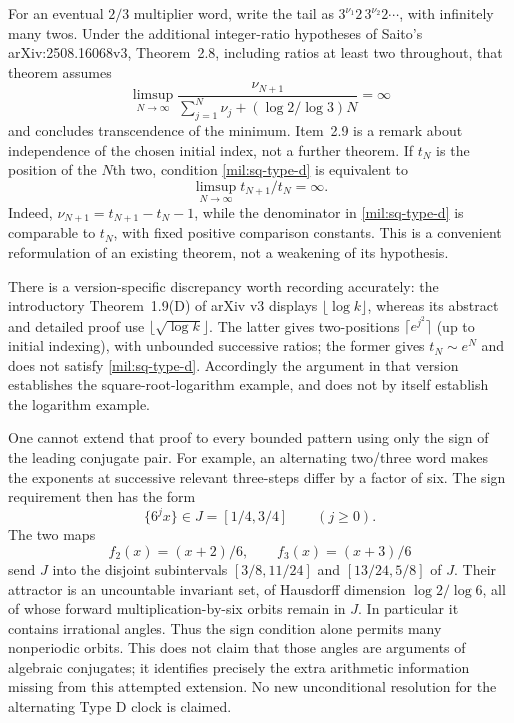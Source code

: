\documentclass[11pt,a4paper]{article}
\theoremstyle{definition}
\theoremstyle{remark}
\numberwithin{equation}{section}
\begin{document}
For an eventual $2/3$ multiplier word, write the tail as
$3^{\nu_1}2\,3^{\nu_2}2\cdots$, with infinitely many twos.
Under the additional integer-ratio hypotheses of Saito's
arXiv:2508.16068v3, Theorem~2.8, including ratios at least two
throughout, that theorem assumes
\begin{equation}\label{mil:sq-type-d}
 \limsup_{N\to\infty}
 \frac{\nu_{N+1}}{\sum_{j=1}^{N}\nu_j+(\log2/\log3)N}=\infty
\end{equation}
and concludes transcendence of the minimum. Item~2.9 is a remark
about independence of the chosen initial index, not a further
theorem. If $t_N$ is the position of the $N$th two, condition
\eqref{mil:sq-type-d} is equivalent to
\[
 \limsup_{N\to\infty}t_{N+1}/t_N=\infty.
\]
Indeed, $\nu_{N+1}=t_{N+1}-t_N-1$, while the denominator in
\eqref{mil:sq-type-d} is comparable to $t_N$, with fixed positive
comparison constants. This is a convenient reformulation of an
existing theorem, not a weakening of its hypothesis.

There is a version-specific discrepancy worth recording accurately:
the introductory Theorem~1.9(D) of arXiv v3 displays
$\lfloor\log k\rfloor$, whereas its abstract and detailed proof
use $\lfloor\sqrt{\log k}\rfloor$. The latter gives two-positions
$\lceil e^{j^2}\rceil$ (up to initial indexing), with unbounded
successive ratios; the former
gives $t_N\sim e^N$ and does not satisfy \eqref{mil:sq-type-d}.
Accordingly the argument in that version establishes the
square-root-logarithm example, and does not by itself establish
the logarithm example.

One cannot extend that proof to every bounded pattern using only
the sign of the leading conjugate pair. For example, an alternating
two/three word makes the exponents at successive relevant
three-steps differ by a factor of six. The sign requirement then
has the form
\[
 \{6^j x\}\in J=[1/4,3/4]\qquad(j\ge0).
\]
The two maps
\[
 f_2(x)=(x+2)/6,\qquad f_3(x)=(x+3)/6
\]
send $J$ into the disjoint subintervals
$[3/8,11/24]$ and $[13/24,5/8]$ of $J$. Their attractor is an
uncountable invariant set, of Hausdorff dimension $\log2/\log6$,
all of whose forward multiplication-by-six orbits remain in $J$.
In particular it contains irrational angles. Thus the sign
condition alone permits many nonperiodic orbits. This does not
claim that those angles are arguments of algebraic conjugates;
it identifies precisely the extra arithmetic information missing
from this attempted extension. No new unconditional resolution
for the alternating Type D clock is claimed.
\end{document}
